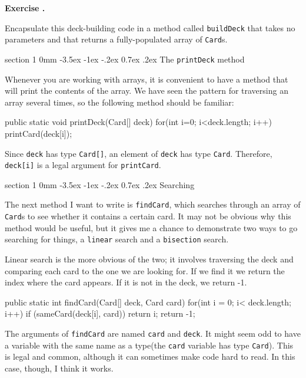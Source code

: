 \documentclass{book}
\makeatletter
\newcounter{exercisenum}
\renewcommand{\theexercisenum}{{\thechapter}.\arabic{exercisenum}}
\newenvironment{exercisesize}{\begin{small}}{\end{small}}
\newcommand{\exerciseheader}[2]{                                          
     
  \begin{exercisesize}                                                    
     
     
  \def\theenumi{\alph{enumi}}                                             
  \def\labelenumi{\theenumi.}                                             
  \def\theenumii{\roman{enumii}}                                          
  \def\labelenumii{\theenumii.}                                           
  {\bf Exercise {#1}{#2}}\hspace{0.1in}                 
}
\newcommand{\startexercise}[1]{%
  \refstepcounter{exercisenum}                                            
  \exerciseheader{\theexercisenum}{#1}                                    
}
\newcommand{\stopexercise}{%
  {\hfill}                                                               
  \end{exercisesize}      
}
\newcommand{\normaldif}{}
\newenvironment{exercise}{\startexercise{\normaldif{}}}{\stopexercise}
\renewcommand{\section}{\@startsection 
    {section} {1} {0mm}%
    {-3.5ex \@plus -1ex \@minus -.2ex}%
    {0.7ex \@plus.2ex}%
    {\normalfont\Large\bfseries}}
\makeatother
\begin{document}

\begin{exercise}
Encapsulate this deck-building code in a method called
{\tt buildDeck} that takes no parameters and that returns a
fully-populated array of {\tt Card}s.
\end{exercise}




\section{The {\tt printDeck} method}
\label{printdeck}

Whenever you are working with arrays, it is convenient to have
a method that will print the contents of the array.  We have
seen the pattern for traversing an array several times, so the
following method should be familiar:

\begin{verbatimtab}
public static void printDeck(Card[] deck) {
    for(int i=0; i<deck.length; i++) {
        printCard(deck[i]);
    }
}
\end{verbatimtab}

Since {\tt deck} has type {\tt Card[]}, an element of {\tt deck}
has type {\tt Card}.  Therefore, {\tt deck[i]} is a legal argument
for {\tt printCard}.



\section{Searching}
\label{findcard}

The next method I want to write is {\tt findCard}, which searches
through an array of {\tt Card}s to see whether it contains a certain
card.  It may not be obvious why this method would be useful, but it
gives me a chance to demonstrate two ways to go searching for things,
a {\tt linear} search and a {\tt bisection} search.


Linear search is the more obvious of the two; it involves traversing
the deck and comparing each card to the one we are looking for.  If we
find it we return the index where the card appears.  If it is not in
the deck, we return -1.

\begin{verbatimtab}
public static int findCard(Card[] deck, Card card) {
    for(int i = 0; i< deck.length; i++) {
        if (sameCard(deck[i], card)) return i;
    }
    return -1;
}
\end{verbatimtab}
%
The arguments of {\tt findCard} are named {\tt card} and {\tt deck}.
It might seem odd to have a variable with the same name as a type(the
{\tt card} variable has type {\tt Card}).  This is legal and common,
although it can sometimes make code hard to read.  In this case,
though, I think it works.
\end{document}
